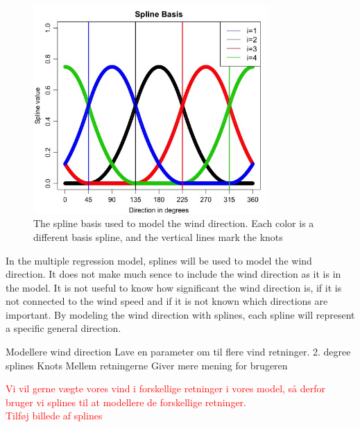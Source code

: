 \begin{figure}
    \centering
    \includegraphics[width=0.8\textwidth]{../../../figures/SplineBasis.jpeg}
    \caption{The spline basis used to model the wind direction. Each color is a different basis spline, and the vertical lines mark the knots}
    \label{fig:spline_basis}
\end{figure}




In the multiple regression model, splines will be used to model the wind direction. It does not make much sence to include the wind direction as it is in the model. It is not useful to know how significant the wind direction is, if it is not connected to the wind speed and if it is not known which directions are important. By modeling the wind direction with splines, each spline will represent a specific general direction.


Modellere wind direction
Lave en parameter om til flere vind retninger.
2. degree splines
Knots
Mellem retningerne
Giver mere mening for brugeren

\textcolor{red}{Vi vil gerne vægte vores vind i forskellige retninger i vores model, så derfor bruger vi splines til at modellere de forskellige retninger.} \\

\textcolor{red}{Tilføj billede af splines}



